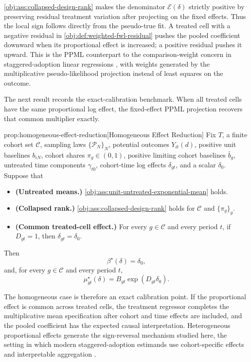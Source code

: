 \cref{obj:ass:collapsed-design-rank} makes the denominator $\mathcal E(\delta)$ strictly positive by preserving residual treatment variation after projecting on the fixed effects. Thus the local sign follows directly from the pseudo-true fit. A treated cell with a negative residual in \cref{obj:def:weighted-fwl-residual} pushes the pooled coefficient downward when its proportional effect is increased; a positive residual pushes it upward. This is the PPML counterpart to the comparison-weight concern in staggered-adoption linear regressions \citep{GoodmanBacon2021,deChaisemartinDHaultfoeuille2020TWFE}, with weights generated by the multiplicative pseudo-likelihood projection instead of least squares on the outcome.

The next result records the exact-calibration benchmark. When all treated cells have the same proportional log effect, the fixed-effect PPML projection recovers that common multiplier exactly.

\begin{theoremv}{prop:homogeneous-effect-reduction}[Homogeneous Effect Reduction]
Fix $T$, a finite cohort set $\mathcal C$, sampling laws $\{\mathcal P_N\}_N$, potential outcomes $Y_{it}(d)$, positive unit baselines $b_{iN}$, cohort shares $\pi_g\in(0,1)$, positive limiting cohort baselines $\bar b_g$, untreated time components $\gamma_{t0}$, cohort-time log effects $\delta_{gt}$, and a scalar $\delta_0$. Suppose that
\begin{itemize}
\item \textbf{(Untreated means.)} \cref{obj:ass:unit-untreated-exponential-mean} holds.
\item \textbf{(Collapsed rank.)} \cref{obj:ass:collapsed-design-rank} holds for $\mathcal C$ and $\{\pi_g\}_g$.
\item \textbf{(Common treated-cell effect.)} For every $g\in\mathcal C$ and every period $t$, if $D_{gt}=1$, then $\delta_{gt}=\delta_0$.
\end{itemize}
Then
\[
\beta^\star(\delta)=\delta_0,
\]
and, for every $g\in\mathcal C$ and every period $t$,
\[
\mu^\star_{gt}(\delta)
=
B_{gt}\exp(D_{gt}\delta_0).
\]
\end{theoremv}

The homogeneous case is therefore an exact calibration point. If the proportional effect is common across treated cells, the treatment regressor completes the multiplicative mean specification after cohort and time effects are included, and the pooled coefficient has the expected causal interpretation. Heterogeneous proportional effects generate the sign-reversal mechanism studied here, the setting in which modern staggered-adoption estimands use cohort-specific effects and interpretable aggregation \citep{CallawaySantAnna2021,SunAbraham2021,BorusyakJaravelSpiess2024}.

